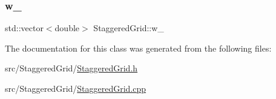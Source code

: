 \subsubsection{\texorpdfstring{w\_}{w\_}}
{\footnotesize\ttfamily std\+::vector$<$double$>$ Staggered\+Grid\+::w\+\_\+\hspace{0.3cm}{\ttfamily [protected]}}



The documentation for this class was generated from the following files\+:\begin{DoxyCompactItemize}
\item 
src/\+Staggered\+Grid/\mbox{\hyperlink{StaggeredGrid_8h}{Staggered\+Grid.\+h}}\item 
src/\+Staggered\+Grid/\mbox{\hyperlink{StaggeredGrid_8cpp}{Staggered\+Grid.\+cpp}}\end{DoxyCompactItemize}
